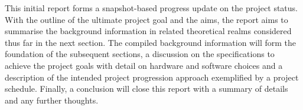 This initial report forms a snapshot-based progress update on the project status. With the outline of the ultimate project goal and the aims, the report aims to summarise the background information in related theoretical realms considered thus far in the next section. The compiled background information will form the foundation of the subsequent sections, a discussion on the specifications to achieve the project goals with detail on hardware and software choices and a description of the intended project progression approach exemplified by a project schedule. Finally, a conclusion will close this report with a summary of details and any further thoughts.
